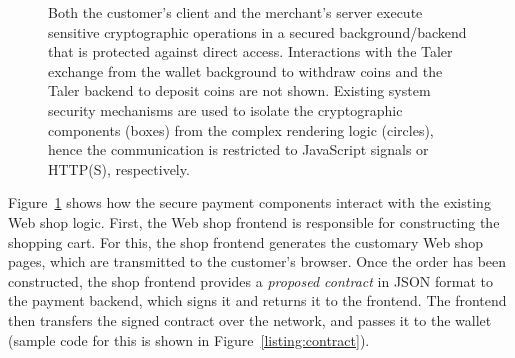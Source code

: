 \documentclass{llncs}
\begin{document}
\begin{figure}[b!]
\begin{center}
\end{center}
 \caption{Both the customer's client and the merchant's server
          execute sensitive cryptographic operations in a
          secured background/backend that is protected against direct access.
          Interactions with the Taler exchange from the wallet background
          to withdraw coins and the Taler backend
          to deposit coins are not shown.
          Existing system security mechanisms
          are used to isolate the cryptographic components (boxes) from
          the complex rendering logic (circles), hence the communication
          is restricted to JavaScript signals or HTTP(S), respectively.}
 \label{fig:frobearch}
\end{figure}

Figure~\ref{fig:frobearch} shows how the secure payment components
interact with the existing Web shop logic.  First, the Web shop
frontend is responsible for constructing the shopping cart.  For this,
the shop frontend generates the customary Web shop pages, which are transmitted
to the customer's browser.  Once the order has been constructed, the
shop frontend provides a {\em proposed contract} in JSON format to the
payment backend, which signs it and returns it to the frontend.  The
frontend then transfers the signed contract over the network, and
passes it to the wallet (sample code for this is shown in
Figure~\ref{listing:contract}).
\end{document}
